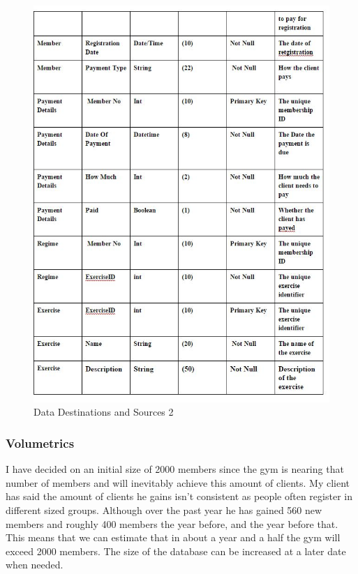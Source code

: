 \begin{figure}[H]
    \includegraphics[width=\textwidth]{DataDictionaryProposed2.JPG}
    \caption{Data Destinations and Sources 2} \label{fig: Data Destinations and Sources 2 }
\end{figure}

\subsubsection{Volumetrics}

I have decided on an initial size of 2000 members since the gym is nearing that number of members and will inevitably achieve this amount of clients.  My client has said the amount of clients he gains isn't consistent as people often register in different sized groups. Although over the past year he has gained 560 new members and roughly 400 members the year before, and the year before that. This means that we can estimate that in about a year and a half the gym will exceed 2000 members. The size of the database can be increased at a later date when needed.  

